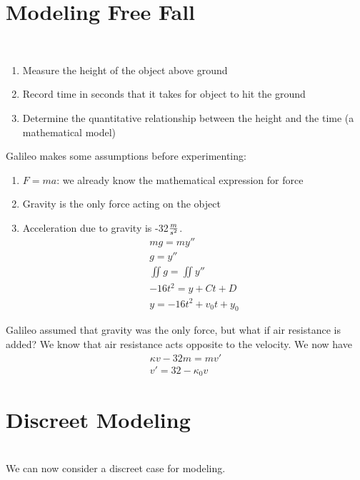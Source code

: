 \documentclass{hw}
\begin{document}
\section{Modeling Free Fall}
\noindent\\

\begin{enumerate}
\item Measure the height of the object above ground
\item Record time in seconds that it takes for object to hit the ground
\item Determine the quantitative relationship between the height and the time (a mathematical
model)
\end{enumerate}
Galileo makes some assumptions before experimenting:
\begin{enumerate}
\item $F = ma$: we already know the mathematical expression for force
\item Gravity is the only force acting on the object
\item Acceleration due to gravity is -32${m\over s^{2}}$.
\begin{gather*}
mg = my''\\
g = y''\\
\iint g = \iint y''\\
-16t^{2} = y + Ct + D\\
y = -16t^{2} + v_{0}t + y_{0}
\end{gather*}
\end{enumerate}
Galileo assumed that gravity was the only force, but what if air resistance is added? We know that
air resistance acts opposite to the velocity. We now have
\begin{gather*}
\kappa v - 32m = mv'\\
v' = 32 - \kappa_{0} v
\end{gather*}

\section{Discreet Modeling}
\noindent\\

We can now consider a discreet case for modeling.
\end{document}
